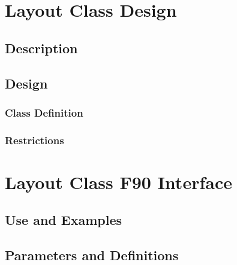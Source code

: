 \documentclass[]{article}
\begin{document}




\section{Layout Class Design}

\subsection{Description}




\subsection{Design}




\subsubsection{Class Definition}




\subsubsection{Restrictions}

%


\section{Layout Class F90 Interface}

\subsection{Use and Examples}

%


\subsection{Parameters and Definitions}

%



%
\end{document}
